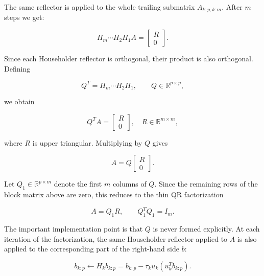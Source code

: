 \documentclass[11pt,a4paper]{article}
\newcommand{\R}{\mathbb{R}}
\begin{document}
The same reflector is applied to the whole trailing submatrix $A_{k:p,k:m}$. After $m$ steps we get:

\begin{equation}
    H_m\cdots H_2H_1 A =
    \begin{bmatrix}
        R \\ 0
    \end{bmatrix}.
\end{equation}

Since each Householder reflector is orthogonal, their product is also
orthogonal. Defining

\begin{equation}
    Q^T = H_m \cdots H_2 H_1,
    \qquad
    Q \in \R^{p\times p},
\end{equation}

we obtain

\begin{equation}
    Q^T A =
    \begin{bmatrix}
        R \\
        0
    \end{bmatrix},
    \quad
    R \in \R^{m\times m},
\end{equation}

where $R$ is upper triangular. Multiplying by $Q$ gives

\begin{equation}
    A =
    Q
    \begin{bmatrix}
        R \\
        0
    \end{bmatrix}.
\end{equation}

Let $Q_1 \in \R^{p\times m}$ denote the first $m$ columns of $Q$. Since the remaining rows of the block matrix above are zero, this reduces to the thin QR factorization

\begin{equation}
    A = Q_1 R,
    \qquad
    Q_1^T Q_1 = I_m.
\end{equation}

The important implementation point is that $Q$ is never formed explicitly.
At each iteration of the factorization, the same Householder reflector applied
to $A$ is also applied to the corresponding part of the right-hand side $b$:

\begin{equation}
    b_{k:p} \leftarrow H_k b_{k:p}
    =
    b_{k:p} - \tau_k u_k \left(u_k^T b_{k:p}\right).
\end{equation}
\end{document}
